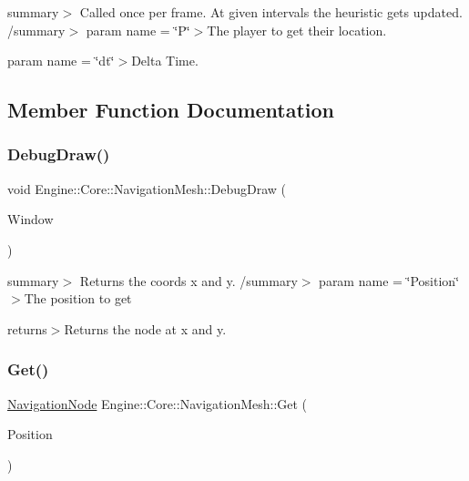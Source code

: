 summary$>$ Called once per frame. At given intervals the heuristic gets updated. /summary$>$ param name = \char`\"{}\+P\char`\"{}$>$The player to get their location.

param name = \char`\"{}dt\char`\"{}$>$Delta Time.

\subsection{Member Function Documentation}
\mbox{\label{class_engine_1_1_core_1_1_navigation_mesh_a86758b74b81e8e48ddbf14466e8e9325}} 
\subsubsection{\texorpdfstring{Debug\+Draw()}{DebugDraw()}}
{\footnotesize\ttfamily void Engine\+::\+Core\+::\+Navigation\+Mesh\+::\+Debug\+Draw (\begin{DoxyParamCaption}\item[{shared\+\_\+ptr$<$ Render\+Window $>$}]{Window }\end{DoxyParamCaption})}

summary$>$ Returns the coords x and y. /summary$>$ param name = \char`\"{}\+Position\char`\"{}$>$The position to get

returns$>$Returns the node at x and y.\mbox{\label{class_engine_1_1_core_1_1_navigation_mesh_a48becc9e01e0a8411c095ff1cc31a372}} 
\subsubsection{\texorpdfstring{Get()}{Get()}}
{\footnotesize\ttfamily \hyperlink{struct_engine_1_1_core_1_1_navigation_node}{Navigation\+Node} Engine\+::\+Core\+::\+Navigation\+Mesh\+::\+Get (\begin{DoxyParamCaption}\item[{Vector2i}]{Position }\end{DoxyParamCaption})}

